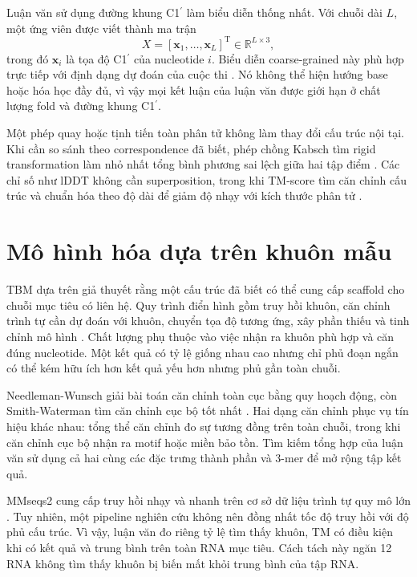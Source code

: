 \documentclass[12pt,a4paper,oneside]{report}
\newcommand{\cprime}{C1$^{\prime}$}
\newcommand{\T}{\mathrm{T}}
\begin{document}
Luận văn sử dụng đường khung \cprime{} làm biểu diễn thống nhất. Với chuỗi dài $L$, một ứng
viên được viết thành ma trận
\begin{equation}
X = [\mathbf{x}_1,\ldots,\mathbf{x}_L]^\T \in \mathbb{R}^{L\times 3},
\end{equation}
trong đó $\mathbf{x}_i$ là tọa độ \cprime{} của nucleotide $i$. Biểu diễn coarse-grained
này phù hợp trực tiếp với định dạng dự đoán của cuộc thi
\cite{competition_paper,kaggle_competition}. Nó không thể hiện hướng base hoặc hóa học
đầy đủ, vì vậy mọi kết luận của luận văn được giới hạn ở chất lượng fold và đường khung
\cprime{}.

Một phép quay hoặc tịnh tiến toàn phân tử không làm thay đổi cấu trúc nội tại. Khi cần
so sánh theo correspondence đã biết, phép chồng Kabsch tìm rigid transformation làm
nhỏ nhất tổng bình phương sai lệch giữa hai tập điểm \cite{kabsch}. Các chỉ số như
lDDT không cần superposition, trong khi TM-score tìm căn chỉnh cấu trúc và chuẩn hóa
theo độ dài để giảm độ nhạy với kích thước phân tử \cite{tm_score,lddt,usalign}.

\section{Mô hình hóa dựa trên khuôn mẫu}

TBM dựa trên giả thuyết rằng một cấu trúc đã biết có thể cung cấp scaffold cho chuỗi
mục tiêu có liên hệ. Quy trình điển hình gồm truy hồi khuôn, căn chỉnh trình tự cần dự đoán với khuôn,
chuyển tọa độ tương ứng, xây phần thiếu và tinh chỉnh mô hình
\cite{rna_progress_review,competition_paper}. Chất lượng phụ thuộc vào việc nhận ra
khuôn phù hợp và căn đúng nucleotide. Một kết quả có tỷ lệ giống nhau cao nhưng chỉ phủ
đoạn ngắn có thể kém hữu ích hơn kết quả yếu hơn nhưng phủ gần toàn chuỗi.

Needleman-Wunsch giải bài toán căn chỉnh toàn cục bằng quy hoạch động, còn
Smith-Waterman tìm căn chỉnh cục bộ tốt nhất \cite{needleman_wunsch,smith_waterman}.
Hai dạng căn chỉnh phục vụ tín hiệu khác nhau: tổng thể căn chỉnh đo sự tương đồng trên
toàn chuỗi, trong khi căn chỉnh cục bộ nhận ra motif hoặc miền bảo tồn. Tìm kiếm tổng hợp
của luận văn sử dụng cả hai cùng các đặc trưng thành phần và 3-mer để mở rộng tập kết quả.

MMseqs2 cung cấp truy hồi nhạy và nhanh trên cơ sở dữ liệu trình tự quy mô lớn
\cite{mmseqs2}. Tuy nhiên, một pipeline nghiên cứu không nên đồng nhất tốc độ truy hồi
với độ phủ cấu trúc. Vì vậy, luận văn đo riêng tỷ lệ tìm thấy khuôn, TM có điều kiện khi
có kết quả và trung bình trên toàn RNA mục tiêu. Cách tách này ngăn 12 RNA không tìm thấy khuôn bị biến mất khỏi
trung bình của tập RNA.
\end{document}
